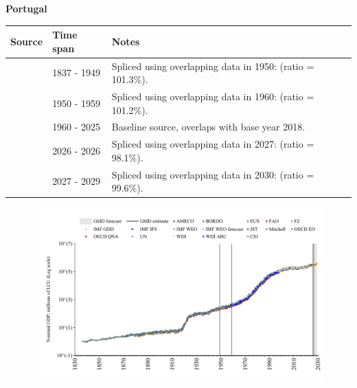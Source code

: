 \documentclass[12pt,a4paper,landscape]{article}
\begin{document}
\begin{adjustbox}{max totalsize={\paperwidth}{\paperheight},center}
\begin{minipage}[t][\textheight][t]{\textwidth}
\vspace*{0.5cm}
{}
\begin{center}
{\Large\bfseries Portugal}
\end{center}
\vspace{0.5cm}
\begin{table}[H]
\centering
\small
\begin{tabular}{|l|l|l|}
\hline
\textbf{Source} & \textbf{Time span} & \textbf{Notes} \\
\hline
\rowcolor{white}\cite{CS1_PRT}& 1837 - 1949 &Spliced using overlapping data in 1950: (ratio = 101.3\%).\\
\rowcolor{lightgray}\cite{IMF_GDD}& 1950 - 1959 &Spliced using overlapping data in 1960: (ratio = 101.2\%).\\
\rowcolor{white}\cite{OECD_EO}& 1960 - 2025 &Baseline source, overlaps with base year 2018.\\
\rowcolor{lightgray}\cite{AMECO}& 2026 - 2026 &Spliced using overlapping data in 2027: (ratio = 98.1\%).\\
\rowcolor{white}\cite{IMF_WEO_forecast}& 2027 - 2029 &Spliced using overlapping data in 2030: (ratio = 99.6\%).\\
\hline
\end{tabular}
\end{table}
\begin{figure}[H]
\centering
\includegraphics[width=\textwidth,height=0.6\textheight,keepaspectratio]{graphs/PRT_nGDP.pdf}
\end{figure}
\end{minipage}
\end{adjustbox}
\end{document}

